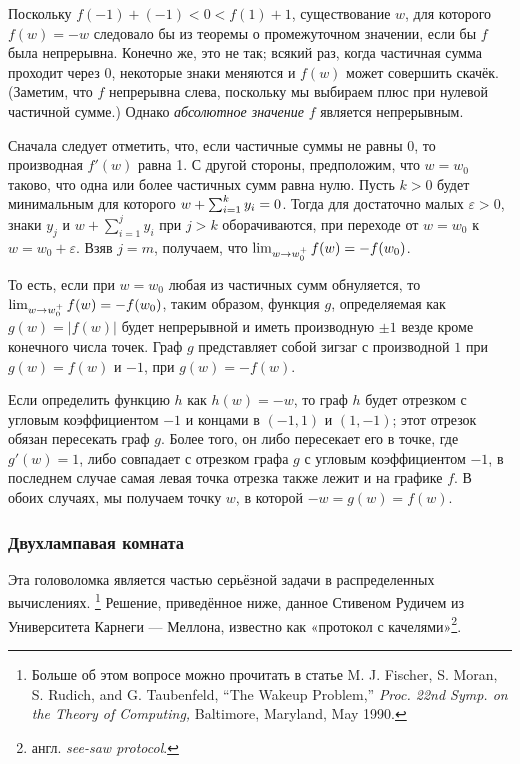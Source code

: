 Поскольку  $f(-1)+(-1)<0 <f(1)+ 1$, существование $w$, для которого $f(w)=-w$ следовало бы из теоремы о промежуточном значении, если бы $f$ была непрерывна.
Конечно же, это не так; всякий раз, когда частичная сумма проходит через 0, некоторые знаки меняются и $f(w)$ может совершить скачёк.
(Заметим, что $f$ непрерывна слева, поскольку мы выбираем плюс при нулевой частичной сумме.)
Однако \emph{абсолютное значение} $f$ является непрерывным.

Сначала следует отметить, что, если частичные суммы не равны $0$, то производная $f'(w)$ равна 1.
С другой стороны, предположим, что $w = w_0$ таково, что одна или более частичных сумм равна нулю.
Пусть $k > 0$ будет минимальным для которого $w+\sum_{i=1}^{k}y_i\z=0$.
Тогда для достаточно малых $\varepsilon>0$,
знаки $y_j$ и $w+\sum_{i=1}^{j}y_i$ при $j>k$ оборачиваются, при переходе от $w = w_0$ к $w = w_0+\varepsilon$.
Взяв $j = m$, получаем, что $\lim_{w\to w_0^+}f(w)\z=-f(w_0)$.

То есть, если при $w=w_0$ любая из частичных сумм обнуляется, то $\lim_{w\to w_0^+}f(w)\z=-f(w_0)$, таким образом, функция $g$, определяемая как $g(w) =|f (w)|$ будет непрерывной и иметь производную $\pm1$ везде кроме конечного числа точек.
Граф $g$ представляет собой зигзаг с производной $1$ при $g (w) = f (w)$ и $-1$, при $g (w) = - f (w)$.

Если определить функцию $h$ как $h (w) = -w$, то граф $h$ будет отрезком с угловым коэффициентом $-1$ и концами в $(-1,1)$ и $(1,-1)$;
этот отрезок обязан пересекать граф $g$.
Более того, он либо пересекает его в точке, где $g'(w) = 1$, либо совпадает с отрезком графа $g$ с угловым коэффициентом $-1$, в последнем случае самая левая точка отрезка также лежит и на графике $f$.
В обоих случаях, мы получаем точку $w$, в которой $-w = g (w) = f (w)$. \heart

\subsubsection*{Двухлампавая комната}

Эта головоломка является частью серьёзной задачи в распределенных вычислениях.%
\footnote{Больше об этом вопросе можно прочитать в статье M. J. Fischer, S. Moran, S. Rudich, and G. Taubenfeld, ``The Wakeup Problem,'' \emph{Proc. 22nd Symp. on the Theory of Computing,} Baltimore, Maryland, May 1990.}
Решение, приведённое ниже, данное Стивеном Рудичем из Университета Карнеги --- Меллона, известно как «протокол с качелями»\footnote{англ. \emph{see-saw protocol}.}.

